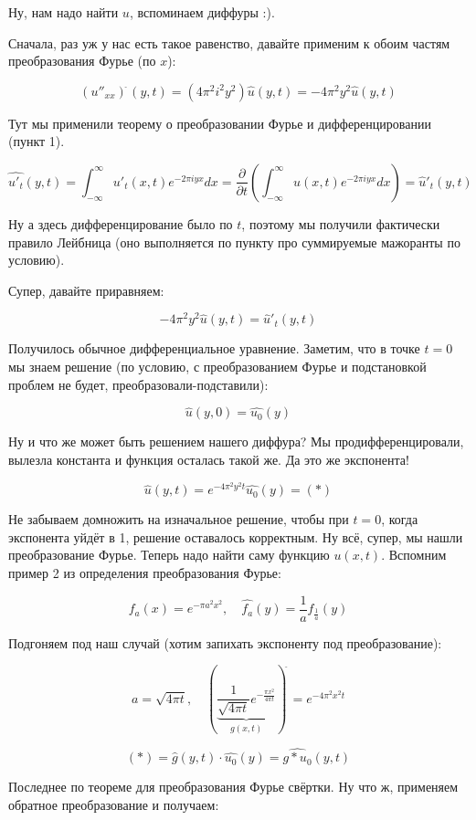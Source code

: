 \documentclass{article}
\begin{document}
Ну, нам надо найти $u$, вспоминаем диффуры :).

Сначала, раз уж у нас есть такое равенство, давайте применим к обоим частям преобразования Фурье (по $x$):

\[(u''_{xx})^{\hat{\,}}(y, t) = (4 \pi^2 i^2 y^2)\hat{u}(y, t) = - 4 \pi^2 y^2 \hat{u}(y, t)\]

Тут мы применили теорему о преобразовании Фурье и дифференцировании (пункт 1).

\[\hat{u'_t}(y, t) = \int_{-\infty}^{\infty} u'_t(x, t)e^{-2\pi i yx} dx = \frac{\partial}{\partial t} \left(\int_{-\infty}^{\infty} u(x, t)e^{-2\pi i yx} dx \right) = \hat{u}'_t(y, t)\]

Ну а здесь дифференцирование было по $t$, поэтому мы получили фактически правило Лейбница (оно выполняется по пункту про суммируемые мажоранты по условию).

Супер, давайте приравняем:

\[- 4 \pi^2 y^2 \hat{u}(y, t) = \hat{u}'_t(y, t)\]

Получилось обычное дифференциальное уравнение. Заметим, что в точке $t = 0$ мы знаем решение (по условию, с преобразованием Фурье и подстановкой проблем не будет, преобразовали-подставили):

\[\hat{u}(y, 0) = \widehat{u_0}(y)\]

Ну и что же может быть решением нашего диффура? Мы продифференцировали, вылезла константа и функция осталась такой же. Да это же экспонента!

\[\hat{u}(y, t) = e^{-4\pi^2 y^2 t}\hat{u_0}(y) = (*)\]

Не забываем домножить на изначальное решение, чтобы при $t = 0$, когда экспонента уйдёт в 1, решение оставалось корректным. Ну всё, супер, мы нашли преобразование Фурье. Теперь надо найти саму функцию $u(x, t)$. Вспомним пример 2 из определения преобразования Фурье:

\[f_a(x) = e^{-\pi a^2x^2}, \quad \widehat{f_a}(y) = \frac{1}{a}f_{\frac{1}{a}}(y)\]

Подгоняем под наш случай (хотим запихать экспоненту под преобразование):

\[a = \sqrt{4 \pi t}, \quad \left(\underbrace{\frac{1}{\sqrt{4 \pi t}} e^{-\frac{\pi x^2}{4 \pi t}}}_{g(x, t)}\right)^{\hat{\,}} = e^{-4\pi^2 x^2 t}\]

\[(*) = \hat{g}(y, t) \cdot \widehat{u_0}(y) = \widehat{g * u_0}(y, t)\]

Последнее по теореме для преобразования Фурье свёртки. Ну что ж, применяем обратное преобразование и получаем:
\end{document}
